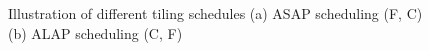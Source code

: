 \begin{figure}
    \centering
    \hspace{0.1cm} 
    \caption{Illustration of different tiling schedules (a) ASAP scheduling (F, C)  (b) ALAP scheduling (C, F)}
    \label{fig:tile_scheduling}
\end{figure}



